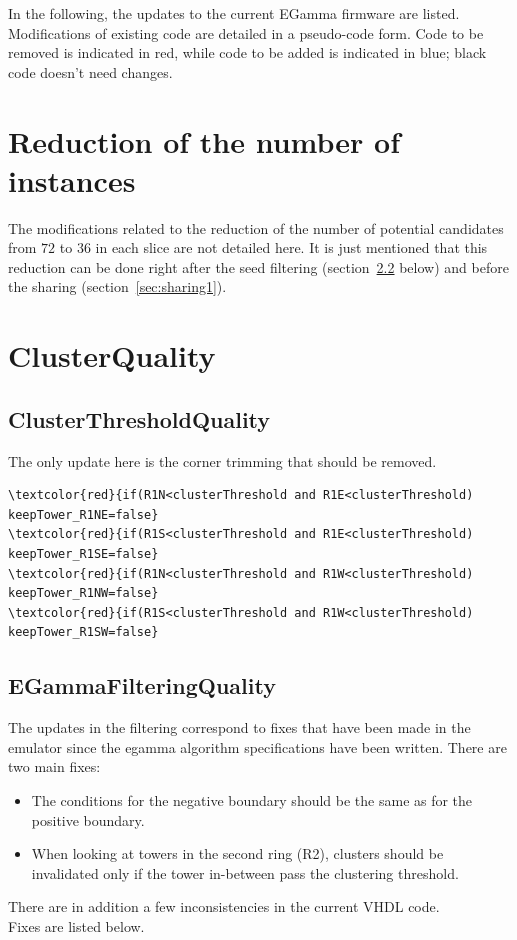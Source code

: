 \documentclass[a4paper, 12pt]{article}
\begin{document}
\newpage

In the following, the updates to the current EGamma firmware are listed. Modifications of existing code are detailed in a pseudo-code form. Code to be removed is indicated in red, while code to be added is indicated in blue; black code doesn't need changes.
%
\section{Reduction of the number of instances}
The modifications related to the reduction of the number of potential candidates from $72$ to $36$ in each slice are not detailed here. It is just mentioned that this reduction can be done right after the seed filtering (section~\ref{sec:filter} below) and before the sharing (section~\ref{sec:sharing1}).


\section{ClusterQuality}
\subsection{ClusterThresholdQuality}
The only update here is the corner trimming that should be removed. 

\begin{Verbatim}[label={Trimming updates}]
\textcolor{red}{if(R1N<clusterThreshold and R1E<clusterThreshold) keepTower_R1NE=false}
\textcolor{red}{if(R1S<clusterThreshold and R1E<clusterThreshold) keepTower_R1SE=false}
\textcolor{red}{if(R1N<clusterThreshold and R1W<clusterThreshold) keepTower_R1NW=false}
\textcolor{red}{if(R1S<clusterThreshold and R1W<clusterThreshold) keepTower_R1SW=false}
\end{Verbatim}

\subsection{EGammaFilteringQuality}\label{sec:filter}
The updates in the filtering correspond to fixes that have been made in the emulator since the egamma algorithm specifications have been written. There are two main fixes:
\begin{itemize}
  \item The conditions for the negative boundary should be the same as for the positive boundary.
  \item When looking at towers in the second ring (R2), clusters should be invalidated only if the tower in-between pass the clustering threshold. 
\end{itemize}
%
There are in addition a few inconsistencies in the current VHDL code. \\
Fixes are listed below.
\end{document}
